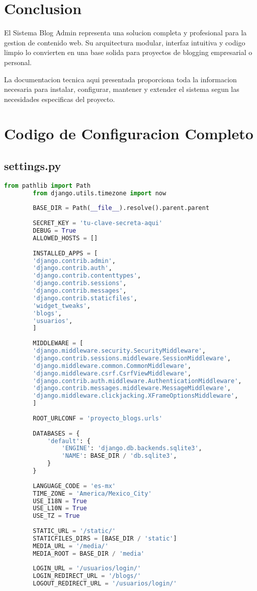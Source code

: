 \documentclass[11pt,a4paper]{report}
\begin{document}
	\section{Conclusion}
	
	El Sistema Blog Admin representa una solucion completa y profesional para la gestion de contenido web. Su arquitectura modular, interfaz intuitiva y codigo limpio lo convierten en una base solida para proyectos de blogging empresarial o personal.
	
	La documentacion tecnica aqui presentada proporciona toda la informacion necesaria para instalar, configurar, mantener y extender el sistema segun las necesidades especificas del proyecto.
	
	\appendix
	
	\section{Codigo de Configuracion Completo}
	
	\subsection{settings.py}
	\begin{lstlisting}[language=python]
		from pathlib import Path
		from django.utils.timezone import now
		
		BASE_DIR = Path(__file__).resolve().parent.parent
		
		SECRET_KEY = 'tu-clave-secreta-aqui'
		DEBUG = True
		ALLOWED_HOSTS = []
		
		INSTALLED_APPS = [
		'django.contrib.admin',
		'django.contrib.auth',
		'django.contrib.contenttypes',
		'django.contrib.sessions',
		'django.contrib.messages',
		'django.contrib.staticfiles',
		'widget_tweaks',
		'blogs',
		'usuarios',
		]
		
		MIDDLEWARE = [
		'django.middleware.security.SecurityMiddleware',
		'django.contrib.sessions.middleware.SessionMiddleware',
		'django.middleware.common.CommonMiddleware',
		'django.middleware.csrf.CsrfViewMiddleware',
		'django.contrib.auth.middleware.AuthenticationMiddleware',
		'django.contrib.messages.middleware.MessageMiddleware',
		'django.middleware.clickjacking.XFrameOptionsMiddleware',
		]
		
		ROOT_URLCONF = 'proyecto_blogs.urls'
		
		DATABASES = {
			'default': {
				'ENGINE': 'django.db.backends.sqlite3',
				'NAME': BASE_DIR / 'db.sqlite3',
			}
		}
		
		LANGUAGE_CODE = 'es-mx'
		TIME_ZONE = 'America/Mexico_City'
		USE_I18N = True
		USE_L10N = True
		USE_TZ = True
		
		STATIC_URL = '/static/'
		STATICFILES_DIRS = [BASE_DIR / 'static']
		MEDIA_URL = '/media/'
		MEDIA_ROOT = BASE_DIR / 'media'
		
		LOGIN_URL = '/usuarios/login/'
		LOGIN_REDIRECT_URL = '/blogs/'
		LOGOUT_REDIRECT_URL = '/usuarios/login/'
	\end{lstlisting}
	
\end{document}
